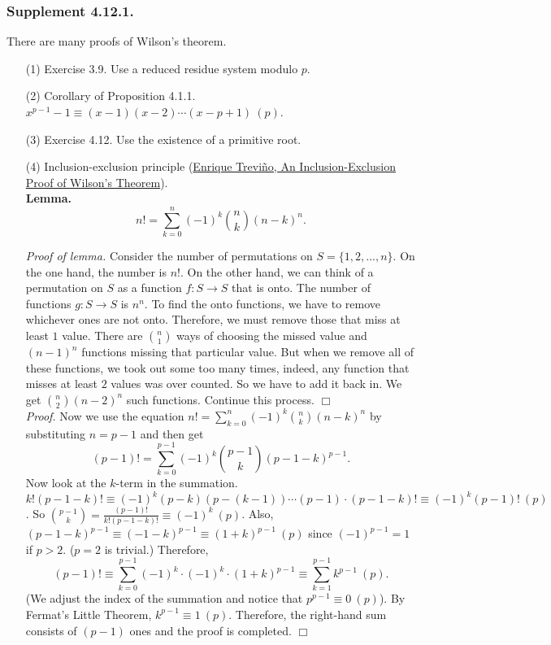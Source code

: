 \documentclass{article}
\begin{document}
\subsubsection*{Supplement 4.12.1.}
There are many proofs of Wilson's theorem.
\begin{enumerate}
\item[(1)]
Exercise 3.9. Use a reduced residue system modulo $p$.
\item[(2)]
Corollary of Proposition 4.1.1. $x^{p - 1} - 1 \equiv (x - 1)(x - 2) \cdots (x - p + 1) \: (p)$.
\item[(3)]
Exercise 4.12. Use the existence of a primitive root.
\item[(4)]
Inclusion-exclusion principle
(\href{http://campus.lakeforest.edu/trevino/WilsonCapsule.pdf}
{Enrique Treviño, An Inclusion-Exclusion Proof of Wilson's Theorem}). \\
\textbf{Lemma.}
$$n! = \sum_{k = 0}^{n}(-1)^k {n \choose k} (n - k)^{n}.$$

\emph{Proof of lemma.}
Consider the number of permutations on $S = \{1, 2, ..., n\}$.
On the one hand, the number is $n!$.
On the other hand, we can think of a permutation on $S$ as a function
$f: S \rightarrow S$ that is onto.
The number of functions $g: S \rightarrow S$ is $n^n$.
To find the onto functions, we have to remove whichever ones are not onto.
Therefore, we must remove those that miss at least $1$ value.
There are ${n \choose 1}$ ways of choosing the missed value and ${(n - 1)}^n$
functions missing that particular value.
But when we remove all of these functions, we took out some too many times, indeed,
any function that misses at least $2$ values was over counted. So we have to add it back in.
We get ${n \choose 2} {(n - 2)}^n$ such functions. Continue this process.
$\Box$ \\

\emph{Proof.}
Now we use the equation $n! = \sum_{k = 0}^{n}(-1)^k {n \choose k} (n - k)^{n}$
by substituting $n = p - 1$ and then get
$$(p - 1)! = \sum_{k = 0}^{p - 1}(-1)^k {p - 1 \choose k} (p - 1 - k)^{p - 1}.$$
Now look at the $k$-term in the summation. \\

$k!(p - 1 - k)! \equiv (-1)^k (p - k)(p - (k - 1)) \cdots (p - 1) \cdot (p - 1 - k)!
\equiv (-1)^k (p - 1)! \: (p)$.
So ${p - 1 \choose k} = \frac{(p - 1)!}{k!(p - 1 - k)!} \equiv (-1)^k \: (p)$.
Also, ${(p - 1 - k)}^{p - 1} \equiv {(-1 - k)}^{p - 1} \equiv {(1 + k)}^{p - 1} \: (p)$
since $(-1)^{p - 1} = 1$ if $p > 2$. ($p = 2$ is trivial.) Therefore,
$$(p - 1)!
\equiv \sum_{k = 0}^{p - 1}(-1)^k \cdot (-1)^k \cdot {(1 + k)}^{p - 1}
\equiv \sum_{k = 1}^{p - 1} k^{p - 1} \: (p).$$
(We adjust the index of the summation and notice that $p^{p - 1} \equiv 0 \: (p)$).
By Fermat’s Little Theorem, $k^{p - 1} \equiv 1 \: (p)$.
Therefore, the right-hand sum consists of $(p - 1)$ ones and the proof is completed.
$\Box$ \\


\end{enumerate}
\end{document}

